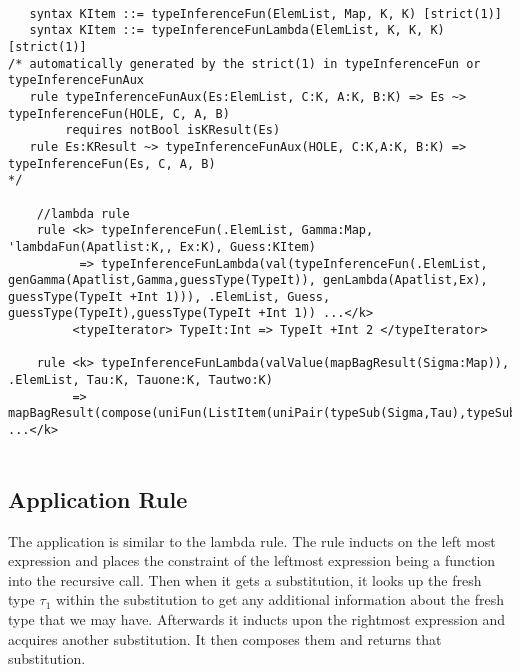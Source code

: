 \begin{lstlisting}

   syntax KItem ::= typeInferenceFun(ElemList, Map, K, K) [strict(1)]
   syntax KItem ::= typeInferenceFunLambda(ElemList, K, K, K) [strict(1)]
/* automatically generated by the strict(1) in typeInferenceFun or typeInferenceFunAux
   rule typeInferenceFunAux(Es:ElemList, C:K, A:K, B:K) => Es ~> typeInferenceFun(HOLE, C, A, B)
        requires notBool isKResult(Es)
   rule Es:KResult ~> typeInferenceFunAux(HOLE, C:K,A:K, B:K) => typeInferenceFun(Es, C, A, B)
*/     

    //lambda rule
    rule <k> typeInferenceFun(.ElemList, Gamma:Map, 'lambdaFun(Apatlist:K,, Ex:K), Guess:KItem)
          => typeInferenceFunLambda(val(typeInferenceFun(.ElemList, genGamma(Apatlist,Gamma,guessType(TypeIt)), genLambda(Apatlist,Ex), guessType(TypeIt +Int 1))), .ElemList, Guess, guessType(TypeIt),guessType(TypeIt +Int 1)) ...</k>
         <typeIterator> TypeIt:Int => TypeIt +Int 2 </typeIterator>

    rule <k> typeInferenceFunLambda(valValue(mapBagResult(Sigma:Map)), .ElemList, Tau:K, Tauone:K, Tautwo:K)
         => mapBagResult(compose(uniFun(ListItem(uniPair(typeSub(Sigma,Tau),typeSub(Sigma,funtype(Tauone,Tautwo))))),Sigma)) ...</k>
    
\end{lstlisting}

\subsection{Application Rule}

The application is similar to the lambda rule. The rule inducts on the left most expression and places the constraint of the leftmost expression being a function into the recursive call. Then when it gets a substitution, it looks up the fresh type \texttt{$\tau_1$} within the substitution to get any additional information about the fresh type that we may have. Afterwards it inducts upon the rightmost expression and acquires another substitution. It then composes them and returns that substitution.

\begin{prooftree}
\end{prooftree}

